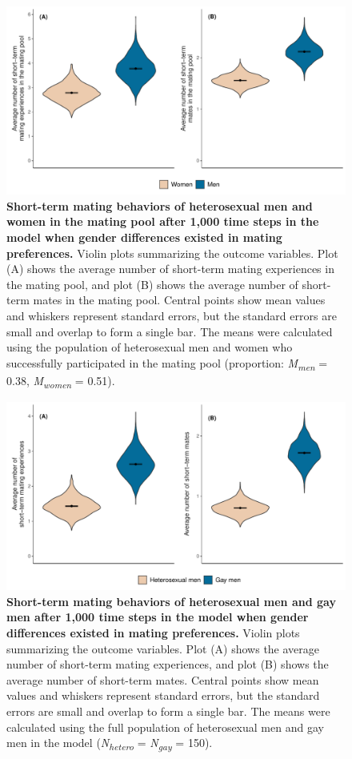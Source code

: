 \documentclass[
  12pt,
]{article}
\begin{document}
\begin{figure}[h]
  \centering
  \includegraphics[width=0.8\columnwidth]{figures/fig2_men_vs_women_inpool.pdf}
  \caption{\textbf{Short-term mating behaviors of heterosexual men and women in the mating pool after 1,000 time steps in the model when gender differences existed in mating preferences.} Violin plots summarizing the outcome variables. Plot (A) shows the average number of short-term mating experiences in the mating pool, and plot (B) shows the average number of short-term mates in the mating pool. Central points show mean values and whiskers represent standard errors, but the standard errors are small and overlap to form a single bar. The means were calculated using the population of heterosexual men and women who successfully participated in the mating pool (proportion: \textit{M\textsubscript{men}} = 0.38, \textit{M\textsubscript{women}} = 0.51).}
  \label{fig:men_vs_women_inpool}
\end{figure}

\begin{figure}[h]
  \centering
  \includegraphics[width=0.8\columnwidth]{figures/fig3_hetero_vs_gay_men.pdf}
  \caption{\textbf{Short-term mating behaviors of heterosexual men and gay men after 1,000 time steps in the model when gender differences existed in mating preferences.} Violin plots summarizing the outcome variables. Plot (A) shows the average number of short-term mating experiences, and plot (B) shows the average number of short-term mates. Central points show mean values and whiskers represent standard errors, but the standard errors are small and overlap to form a single bar. The means were calculated using the full population of heterosexual men and gay men in the model (\textit{N\textsubscript{hetero}} = \textit{N\textsubscript{gay}} = 150).}
  \label{fig:hetero_vs_gay}
\end{figure}
\end{document}

